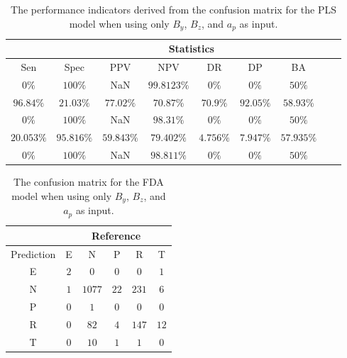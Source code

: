 \begin{table}[!ht]
	\centering
	\begin{tabular}{|c|c|c|c|c|c|c|c|c|}
		\hline
		 & \multicolumn{7}{c|}{Statistics} \\ \hline
		Sen & Spec & PPV & NPV & DR & DP & BA \\ \hline
		$0\%$ & $100\%$ & NaN & $99.8123\%$ & $0\%$ & $0\%$ & $50\%$ \\ \hline
		$96.84\%$ & $21.03\%$ & $77.02\%$ & $70.87\%$ & $70.9\%$ & $92.05\%$ & $58.93\%$ \\ \hline
		$0\%$ & $100\%$ & NaN & $98.31\%$ & $0\%$ & $0\%$ & $50\%$ \\ \hline
		$20.053\%$ & $95.816\%$ & $59.843\%$ & $79.402\%$ & $4.756\%$ & $7.947\%$ & $57.935\%$ \\ \hline
		$0\%$ & $100\%$ & NaN & $98.811\%$ & $0\%$ & $0\%$ & $50\%$ \\ \hline
	\end{tabular}
	\caption{The performance indicators derived from the confusion matrix for the PLS model when using only $B_{y}$, $B_{z}$, and $a_{p}$ as input.}
	\label{tab:cs:yzap:pls}
\end{table}

\begin{table}[!ht]
	\centering
	\begin{tabular}{|c|c|c|c|c|c|}
		\hline
		 & \multicolumn{5}{|c|}{Reference} \\ \hline
		 Prediction & E & N & P & R & T \\ \hline
		 E & $2$ & $0$ & $0$ & $0$ & $1$ \\ \hline
		 N & $1$ & $1077$ & $22$ & $231$ & $6$ \\ \hline
		 P & $0$ & $1$ & $0$ & $0$ & $0$ \\ \hline
		 R & $0$ & $82$ & $4$ & $147$ & $12$ \\ \hline
		 T & $0$ & $10$ & $1$ & $1$ & $0$ \\ \hline
	\end{tabular}
	\caption{The confusion matrix for the FDA model when using only $B_{y}$, $B_{z}$, and $a_{p}$ as input.}
	\label{tab:cm:yzap:fda}
\end{table}

